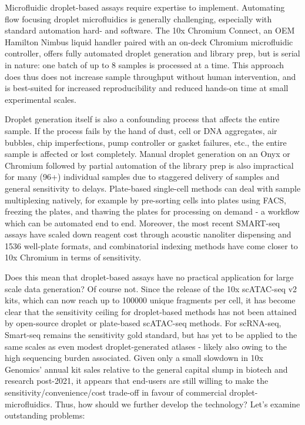 Microfluidic droplet-based assays require expertise to implement. Automating flow focusing droplet microfluidics is generally challenging, especially with standard automation hard- and software. The 10x Chromium Connect, an OEM Hamilton Nimbus liquid handler paired with an on-deck Chromium microfluidic controller, offers fully automated droplet generation and library prep, but is serial in nature: one batch of up to 8 samples is processed at a time. This approach does thus does not increase sample throughput without human intervention, and is best-suited for increased reproducibility and reduced hands-on time at small experimental scales.

Droplet generation itself is also a confounding process that affects the entire sample. If the process fails by the hand of dust, cell or DNA aggregates, air bubbles, chip imperfections, pump controller or gasket failures, etc., the entire sample is affected or lost completely. Manual droplet generation on an Onyx or Chromium followed by partial automation of the library prep is also impractical for many (96+) individual samples due to staggered delivery of samples and general sensitivity to delays. Plate-based single-cell methods can deal with sample multiplexing natively, for example by pre-sorting cells into plates using FACS, freezing the plates, and thawing the plates for processing on demand - a workflow which can be automated end to end. Moreover, the most recent SMART-seq assays have scaled down reagent cost through acoustic nanoliter dispensing and \num{1536} well-plate formats, and combinatorial indexing methods have come closer to 10x Chromium in terms of sensitivity.

Does this mean that droplet-based assays have no practical application for large scale data generation? Of course not. Since the release of the 10x scATAC-seq v2 kits, which can now reach up to \num{100000} unique fragments per cell, it has become clear that the sensitivity ceiling for droplet-based methods has not been attained by open-source droplet or plate-based scATAC-seq methods. For scRNA-seq, Smart-seq remains the sensitivity gold standard, but has yet to be applied to the same scales as even modest droplet-generated atlases - likely also owing to the high sequencing burden associated. Given only a small slowdown in 10x Genomics' annual kit sales relative to the general capital slump in biotech and research post-2021, it appears that end-users are still willing to make the sensitivity/convenience/cost trade-off in favour of commercial droplet-microfluidics. Thus, how should we further develop the technology? Let's examine outstanding problems:

